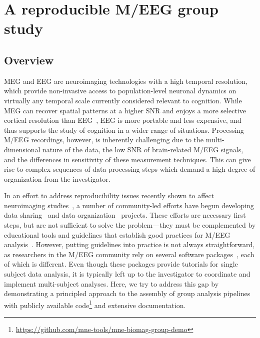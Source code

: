 \chapter{A reproducible M/EEG group study}

\section{Overview}


\Ac{MEG} and \ac{EEG} are neuroimaging technologies with a high temporal resolution, which provide non-invasive access to population-level neuronal dynamics on virtually any temporal scale currently considered relevant to cognition. %
While MEG can recover spatial patterns at a higher \ac{SNR} and enjoys a more selective cortical resolution than \ac{EEG}~\citep{baillet17}, EEG is more portable and less expensive, and thus supports the study of cognition in a wider range of situations. Processing M/EEG recordings, however, is inherently challenging due to the multi-dimensional nature of the data, the low \ac{SNR} of brain-related M/EEG signals, and the differences in sensitivity of these measurement techniques. This can give rise to complex sequences of data processing steps which demand a high degree of organization from the investigator.

In an effort to address reproducibility issues recently shown to affect neuroimaging studies~\citep{ioannidis2005most, button2013power,Carp2012,Carp2012289}, a number of community-led efforts have begun developing data sharing~\citep{poldrack2017openfmri} and data organization~\citep{gorgolewski2016brain, galan2017meg} projects. These efforts are necessary first steps, but are not sufficient to solve the problem---they must be complemented by educational tools and guidelines that establish good practices for M/EEG analysis~\citep{gross-etal:13}. However, putting guidelines into practice is not always straightforward, as researchers in the M/EEG community rely on several software packages~\citep{brainstorm,eeglab,eeglab2,fieldTrip,nutmeg,spm}, each of which is different. Even though these packages provide tutorials for single subject data analysis, it is typically left up to the investigator to coordinate and implement multi-subject analyses. Here, we try to address this gap by demonstrating a principled approach to the assembly of group analysis pipelines with publicly available code\footnote{\url{https://github.com/mne-tools/mne-biomag-group-demo}} and extensive documentation. 

